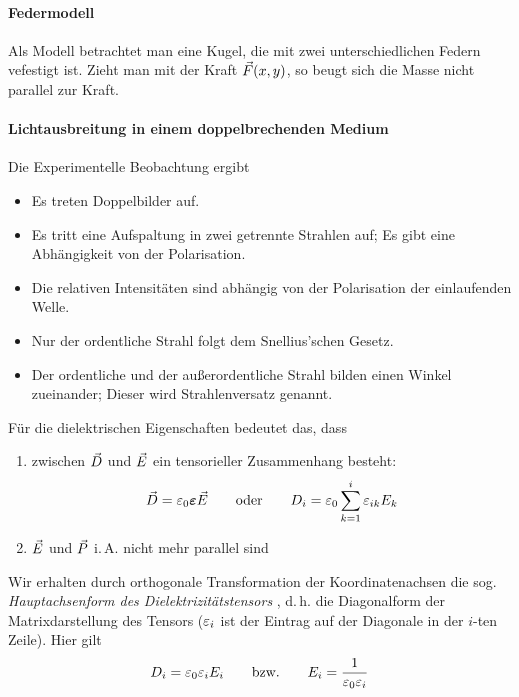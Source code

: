 \paragraph{Federmodell}
Als Modell betrachtet man eine Kugel, die mit zwei unterschiedlichen
Federn vefestigt ist.
Zieht man mit der Kraft $\vec{F}(x,y)$, so beugt sich die Masse nicht
parallel zur Kraft.

\paragraph{Lichtausbreitung in einem doppelbrechenden Medium}
Die Experimentelle Beobachtung ergibt
\begin{itemize}
\item Es treten Doppelbilder auf.
\item Es tritt eine Aufspaltung in zwei getrennte Strahlen auf; Es
  gibt eine Abhängigkeit von der Polarisation.
\item Die relativen Intensitäten sind abhängig von der Polarisation
  der einlaufenden Welle.
\item Nur der ordentliche Strahl folgt dem Snellius'schen Gesetz.
\item Der ordentliche und der außerordentliche Strahl bilden einen
  Winkel zueinander; Dieser wird
  Strahlenversatz genannt.
\end{itemize}
Für die dielektrischen Eigenschaften bedeutet das, dass
\begin{enumerate}
\item zwischen $\vec{D}$ und $\vec{E}$ ein tensorieller Zusammenhang
  besteht:
  \begin{gather*}
    \vec{D}=\varepsilon_0\boldsymbol{\varepsilon}\vec{E}
    \qquad\text{oder}\qquad
    D_i = \varepsilon_0\sum_{k=1}^i \varepsilon_{ik}E_k
  \end{gather*}%
\item $\vec{E}$ und $\vec{P}$ i.\,A. nicht mehr parallel sind
\end{enumerate}
Wir erhalten durch orthogonale Transformation der Koordinatenachsen die
sog. \emph{Hauptachsenform des Dielektrizitätstensors}%
,
d.\,h. die Diagonalform der Matrixdarstellung des Tensors 
($\varepsilon_i$%
ist der Eintrag auf der Diagonale in der $i$-ten Zeile). Hier gilt
\begin{gather*}
  D_i = \varepsilon_0\varepsilon_iE_i
  \qquad\text{bzw.}\qquad
  E_i = \frac{1}{\varepsilon_0\varepsilon_i}
\end{gather*}%
